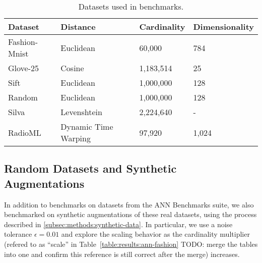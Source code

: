 \begin{table}[!t]
    \caption{Datasets used in benchmarks.}
    \label{table:datasets:summary}
    \vskip 0.15in
    \begin{center}
        \begin{small}
            \begin{sc}
                \begin{tabular}{|l|l|l|l|}
                    \hline
                    \textbf{Dataset} & \textbf{Distance}  &\textbf{Cardinality}  & \textbf{Dimensionality}  \\
                    \hline
                    Fashion-Mnist    & Euclidean              & 60,000             & 784       \\
                    \hline
                    Glove-25         & Cosine                 & 1,183,514          & 25        \\
                    \hline
                    Sift             & Euclidean              & 1,000,000          & 128       \\
                    \hline
                    Random           & Euclidean              & 1,000,000          & 128       \\
                    \hline
                    Silva            & Levenshtein            & 2,224,640          & -         \\
                    \hline
                    RadioML          & Dynamic Time Warping   & 97,920             & 1,024     \\
                    \hline
                \end{tabular}
            \end{sc}
        \end{small}
    \end{center}
    \vskip -0.1in
\end{table}

\subsection{Random Datasets and Synthetic Augmentations}
\label{subsec:random-datasets}

In addition to benchmarks on datasets from the ANN Benchmarks suite, we also benchmarked on synthetic augmentations of these real datasets, using the process described in \ref{subsec:methods:synthetic-data}. 
In particular, we use a noise tolerance $\epsilon = 0.01$ and explore the scaling behavior as the cardinality multiplier (refered to as ``scale'' in Table~\ref{table:results:ann-fashion} {\color{red} TODO: merge the tables into one and confirm this reference is still correct after the merge}) increases. 

